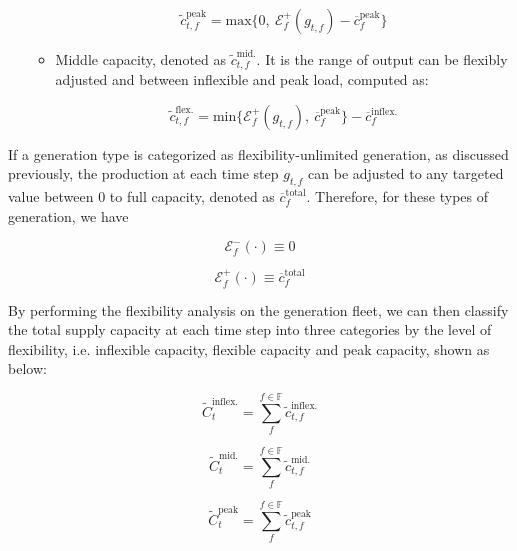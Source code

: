 \begin{enumerate}
\begin{itemize}
		\begin{equation*}
		\tilde{c}_{t,f}^{\text{peak}} = \text{max}\{0,~\mathcal{E}_f^+(g_{t,f}) -\overline{c}_f^{\text{peak}}\}
		\end{equation*}
		
		\item Middle capacity, denoted as $\tilde{c}_{t,f}^{\text{mid.}}$. It is the range of output can be flexibly adjusted and between inflexible and peak load, computed as:
		
		\begin{equation*}
		\tilde{c}_{t,f}^{\text{flex.}} = \text{min} \{\mathcal{E}_f^+(g_{t,f}),~\overline{c}_f^{\text{peak}}\} - \overline{c}_f^{\text{inflex.}}
		\end{equation*}
		
	\end{itemize}
\end{enumerate}


If a generation type is categorized as flexibility-unlimited generation, as discussed previously, the production at each time step $g_{t,f}$ can be adjusted to any targeted value between 0 to full capacity, denoted as $\overline{c}_f^{\text{total}}$. Therefore, for these types of generation, we have 

\begin{equation*}
\mathcal{E}_f^-(\cdot) \equiv 0
\end{equation*}

\begin{equation*}
\mathcal{E}_f^+(\cdot) \equiv \overline{c}_f^{\text{total}}
\end{equation*}

By performing the flexibility analysis on the generation fleet, we can then classify the total supply capacity at each time step into three categories by the level of flexibility, i.e. inflexible capacity, flexible capacity and peak capacity, shown as below:

\begin{equation}
\label{eq:inflex_total}
\tilde{C}_{t}^{\text{inflex.}} = \sum_{f}^{f \in \mathbb{F}} \tilde{c}_{t,f}^{\text{inflex.}}
\end{equation}

\begin{equation}
\tilde{C}_{t}^{\text{mid.}} = \sum_{f}^{f \in \mathbb{F}} \tilde{c}_{t,f}^{\text{mid.}}
\end{equation}

\begin{equation}
\label{eq:peak_total}
\tilde{C}_{t}^{\text{peak}} = \sum_{f}^{f \in \mathbb{F}} \tilde{c}_{t,f}^{\text{peak}}
\end{equation}

